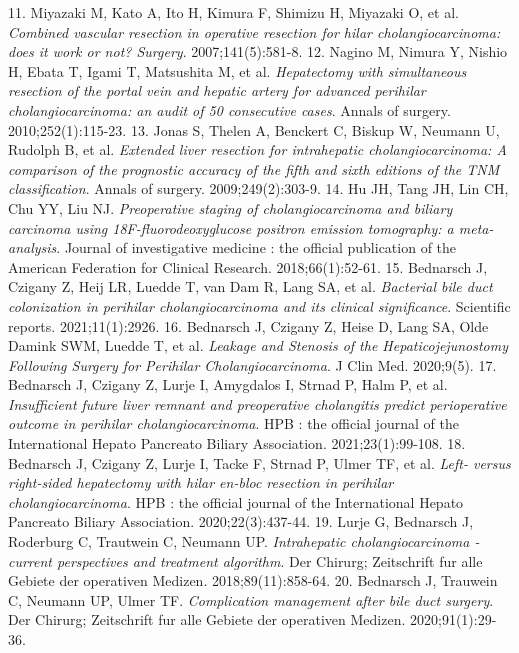 \documentclass[12pt]{article}
\begin{document}
\begin{thebibliography}{22}
11.	Miyazaki M, Kato A, Ito H, Kimura F, Shimizu H, Miyazaki O, et al. \textit{Combined vascular resection in operative resection for hilar cholangiocarcinoma: does it work or not? Surgery}. 2007;141(5):581-8.
12.	Nagino M, Nimura Y, Nishio H, Ebata T, Igami T, Matsushita M, et al. \textit{Hepatectomy with simultaneous resection of the portal vein and hepatic artery for advanced perihilar cholangiocarcinoma: an audit of 50 consecutive cases}. Annals of surgery. 2010;252(1):115-23.
13.	Jonas S, Thelen A, Benckert C, Biskup W, Neumann U, Rudolph B, et al. \textit{Extended liver resection for intrahepatic cholangiocarcinoma: A comparison of the prognostic accuracy of the fifth and sixth editions of the TNM classification}. Annals of surgery. 2009;249(2):303-9.
14.	Hu JH, Tang JH, Lin CH, Chu YY, Liu NJ. \textit{Preoperative staging of cholangiocarcinoma and biliary carcinoma using 18F-fluorodeoxyglucose positron emission tomography: a meta-analysis}. Journal of investigative medicine : the official publication of the American Federation for Clinical Research. 2018;66(1):52-61.
15.	Bednarsch J, Czigany Z, Heij LR, Luedde T, van Dam R, Lang SA, et al. \textit{Bacterial bile duct colonization in perihilar cholangiocarcinoma and its clinical significance}. Scientific reports. 2021;11(1):2926.
16.	Bednarsch J, Czigany Z, Heise D, Lang SA, Olde Damink SWM, Luedde T, et al. \textit{Leakage and Stenosis of the Hepaticojejunostomy Following Surgery for Perihilar Cholangiocarcinoma}. J Clin Med. 2020;9(5).
17.	Bednarsch J, Czigany Z, Lurje I, Amygdalos I, Strnad P, Halm P, et al. \textit{Insufficient future liver remnant and preoperative cholangitis predict perioperative outcome in perihilar cholangiocarcinoma}. HPB : the official journal of the International Hepato Pancreato Biliary Association. 2021;23(1):99-108.
18.	Bednarsch J, Czigany Z, Lurje I, Tacke F, Strnad P, Ulmer TF, et al. \textit{Left- versus right-sided hepatectomy with hilar en-bloc resection in perihilar cholangiocarcinoma}. HPB : the official journal of the International Hepato Pancreato Biliary Association. 2020;22(3):437-44.
19.	Lurje G, Bednarsch J, Roderburg C, Trautwein C, Neumann UP. \textit{Intrahepatic cholangiocarcinoma - current perspectives and treatment algorithm}. Der Chirurg; Zeitschrift fur alle Gebiete der operativen Medizen. 2018;89(11):858-64.
20.	Bednarsch J, Trauwein C, Neumann UP, Ulmer TF. \textit{Complication management after bile duct surgery}. Der Chirurg; Zeitschrift fur alle Gebiete der operativen Medizen. 2020;91(1):29-36.

\end{thebibliography}
\end{document}
